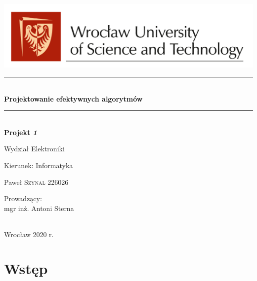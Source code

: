\documentclass{article}
\begin{document}
\begin{titlepage}
    \newcommand{\HRule}{\rule{\linewidth}{0.5mm}}
    \center
    \includegraphics[scale=0.4]{logo.jpg}\\[1cm] 
    \HRule \\[0.8cm]
    { \Large \bfseries 	 Projektowanie efektywnych algorytmów }\\[0.4cm]
    \HRule \\[1.5cm]
    { \Large \bfseries Projekt \textit{1}}\\[0.4cm]
    \textbf{ }
    \vspace{10mm} 
    
    \begin{minipage}{0.4\textwidth}
    \begin{flushleft} \large
    \end{flushleft}
    \end{minipage}
    \begin{minipage}{0.5\textwidth}
    \begin{flushright} \large
    \vfill
    \vspace{10mm} %
    \par Wydział Elektroniki
    \par Kierunek: Informatyka
    \vfill
    \par Paweł \textsc{Szynal 226026} \\
    \vspace{10mm} %
   \vspace{10mm} %
   \par Prowadzący:\\ mgr inż. Antoni Sterna
    \end{flushright}
    \end{minipage}\\[3cm]
     {\large Wrocław 2020 r.}\\[2cm]
\end{titlepage}
   
\newpage
    
\tableofcontents
\newpage

\section{Wstęp}
\end{document}
